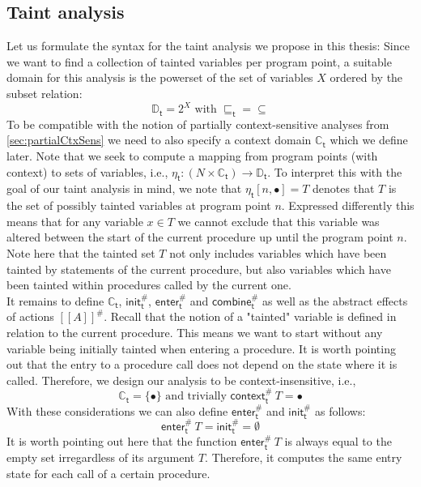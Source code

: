     \subsection{Taint analysis}\label{sec:formalTaint}
      Let us formulate the syntax for the taint analysis we propose in this thesis: Since we want to find a collection of tainted variables per program point, a suitable domain for this analysis is the powerset of the set of variables $X$ ordered by the subset relation:
      \[\mathbb{D}_\textsf{t} = 2^X \text{ with } \sqsubseteq_\textsf{t} = \subseteq\]
      To be compatible with the notion of partially context-sensitive analyses from \autoref{sec:partialCtxSens} we need to also specify a context domain $\mathbb{C}_\textsf{t}$ which we define later.
      Note that we seek to compute a mapping from program points (with context) to sets of variables, i.e., $\eta_\textsf{t}: (N \times \mathbb{C}_\textsf{t}) \rightarrow \mathbb{D}_\textsf{t}$. To interpret this with the goal of our taint analysis in mind, we note that $\eta_\textsf{t} [n, \bullet] = T$ denotes that $T$ is the set of possibly tainted variables at program point $n$. Expressed differently this means that for any variable $x \in T$ we cannot exclude that this variable was altered between the start of the current procedure up until the program point $n$. Note here that the tainted set $T$ not only includes variables which have been tainted by statements of the current procedure, but also variables which have been tainted within procedures called by the current one.\\
      It remains to define $\mathbb{C}_\textsf{t}$, $\textsf{init}^{\#}_\textsf{t}$, $\textsf{enter}^{\#}_\textsf{t}$ and $\textsf{combine}^{\#}_\textsf{t}$ as well as the abstract effects of actions $[\![ A ]\!]^{\#}$. Recall that the notion of a "tainted" variable is defined in relation to the current procedure. This means we want to start without any variable being initially tainted when entering a procedure. It is worth pointing out that the entry to a procedure call does not depend on the state where it is called. Therefore, we design our analysis to be context-insensitive, i.e., 
      \[\mathbb{C}_\textsf{t} = \{\bullet\} \text{ and trivially } \textsf{context}^{\#}_\textsf{t}\ T = \bullet\]
      With these considerations we can also define $\textsf{enter}^{\#}_\textsf{t}$ and $\textsf{init}^{\#}_\textsf{t}$ as follows:
      \[\textsf{enter}^{\#}_\textsf{t}\ T = \textsf{init}^{\#}_\textsf{t} = \emptyset\]
      It is worth pointing out here that the function $\textsf{enter}^{\#}_\textsf{t}\ T$ is always equal to the empty set irregardless of its argument $T$. Therefore, it computes the same entry state for each call of a certain procedure.\\
